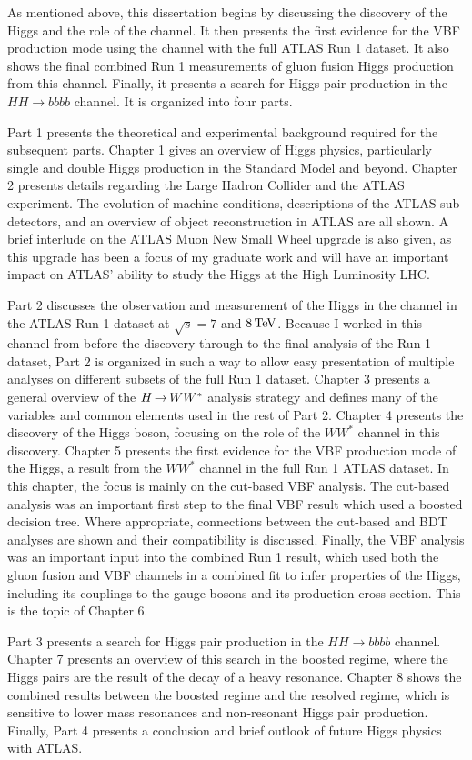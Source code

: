 As mentioned above, this dissertation begins by discussing the discovery of the Higgs and the role of the \HWWfull channel. It then presents the first evidence for the VBF production mode using the \HWWfull channel with the full ATLAS Run 1 dataset. It also shows the final combined Run 1 measurements of gluon fusion Higgs production from this channel. Finally, it presents a search for Higgs pair production in the $HH\to b\bar{b}b\bar{b}$ channel. It is organized into four parts. 

Part 1 presents the theoretical and experimental background required for the subsequent parts. Chapter 1 gives an overview of Higgs physics, particularly single and double Higgs production in the Standard Model and beyond. Chapter 2 presents details regarding the Large Hadron Collider and the ATLAS experiment. The evolution of machine conditions, descriptions of the ATLAS sub-detectors, and an overview of object reconstruction in ATLAS are all shown. A brief interlude on the ATLAS Muon New Small Wheel upgrade is also given, as this upgrade has been a focus of my graduate work and will have an important impact on ATLAS' ability to study the Higgs at the High Luminosity LHC. 

Part 2 discusses the observation and measurement of the Higgs in the \HWWfull channel in the ATLAS Run 1 dataset at $\sqrt{s} = 7$ and $8 \TeV$. Because I worked in this channel from before the discovery through to the final analysis of the Run 1 dataset, Part 2 is organized in such a way to allow easy presentation of multiple analyses on different subsets of the full Run 1 dataset. Chapter 3 presents a general overview of the $H{\,{\rightarrow}\,}WW^\ast$ analysis strategy and defines many of the variables and common elements used in the rest of Part 2. Chapter 4 presents the discovery of the Higgs boson, focusing on the role of the $WW^*$ channel in this discovery. Chapter 5 presents the first evidence for the VBF production mode of the Higgs, a result from the $WW^*$ channel in the full Run 1 ATLAS dataset. In this chapter, the focus is mainly on the cut-based VBF analysis. The cut-based analysis was an important first step to the final VBF result which used a boosted decision tree. Where appropriate, connections between the cut-based and BDT analyses are shown and their compatibility is discussed. Finally, the VBF analysis was an important input into the combined Run 1 \HWWfull result, which used both the gluon fusion and VBF channels in a combined fit to infer properties of the Higgs, including its couplings to the gauge bosons and its production cross section. This is the topic of Chapter 6. 

Part 3 presents a search for Higgs pair production in the $HH \to b\bar{b} b\bar{b}$ channel. Chapter 7 presents an overview of this search in the boosted regime, where the Higgs pairs are the result of the decay of a heavy resonance. Chapter 8 shows the combined results between the boosted regime and the resolved regime, which is sensitive to lower mass resonances and non-resonant Higgs pair production. Finally, Part 4 presents a conclusion and brief outlook of future Higgs physics with ATLAS.